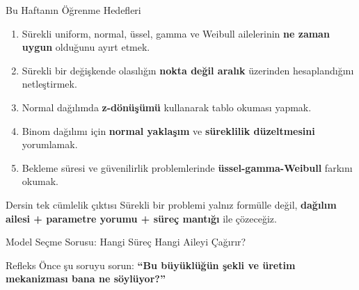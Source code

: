 \documentclass[light]{lutbeamer}
\begin{document}
\begin{frame}{Bu Haftanın Öğrenme Hedefleri}
    \small
    \begin{enumerate}
        \item Sürekli uniform, normal, üssel, gamma ve Weibull ailelerinin \textbf{ne zaman uygun} olduğunu ayırt etmek.
        \item Sürekli bir değişkende olasılığın \textbf{nokta değil aralık} üzerinden hesaplandığını netleştirmek.
        \item Normal dağılımda \textbf{z-dönüşümü} kullanarak tablo okuması yapmak.
        \item Binom dağılımı için \textbf{normal yaklaşım} ve \textbf{süreklilik düzeltmesini} yorumlamak.
        \item Bekleme süresi ve güvenilirlik problemlerinde \textbf{üssel-gamma-Weibull} farkını okumak.
    \end{enumerate}

    \begin{exampleblock}{Dersin tek cümlelik çıktısı}
        Sürekli bir problemi yalnız formülle değil, \textbf{dağılım ailesi + parametre yorumu + süreç mantığı} ile çözeceğiz.
    \end{exampleblock}
\end{frame}

\begin{frame}{Model Seçme Sorusu: Hangi Süreç Hangi Aileyi Çağırır?}
    \scriptsize
    \begin{center}
    \end{center}

    \begin{alertblock}{Refleks}
        Önce şu soruyu sorun:
        \textbf{``Bu büyüklüğün şekli ve üretim mekanizması bana ne söylüyor?''}
    \end{alertblock}
\end{frame}
\end{document}
